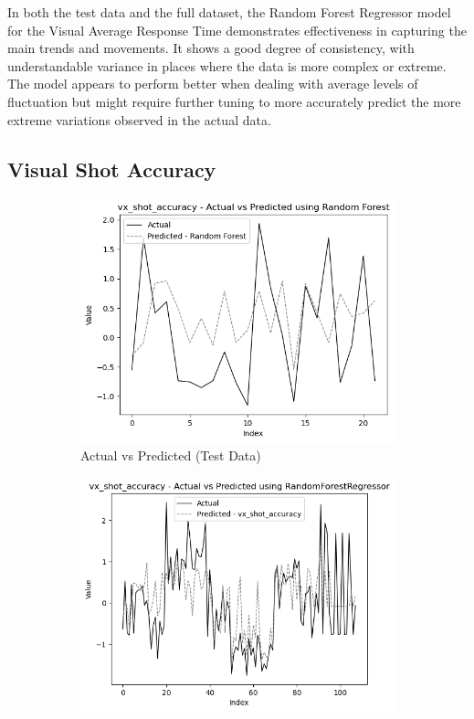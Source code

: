In both the test data and the full dataset, the Random Forest Regressor model for the Visual Average Response Time demonstrates effectiveness in capturing the main trends and movements.
It shows a good degree of consistency, with understandable variance in places where the data is more complex or extreme. The model appears to perform better when dealing with average levels of
fluctuation but might require further tuning to more accurately predict the more extreme variations observed in the actual data.


\subsection*{Visual Shot Accuracy}

\begin{figure}[htbp]
    \centering
    \begin{subfigure}[b]{0.49\textwidth}
        \centering
        \includegraphics[width=\textwidth]{images/regressionCharts/test_data_visual_shot_accuracy.png}
        \caption{Actual vs Predicted (Test Data)}
        \label{fig:actual_vs_predicted_vx_shot_accuracy_test}
    \end{subfigure}\hfill
    \begin{subfigure}[b]{0.49\textwidth}
        \centering
        \includegraphics[width=\textwidth]{images/regressionCharts/all_data_visual_shot_accuracy.png}

\end{subfigure}
\end{figure}
